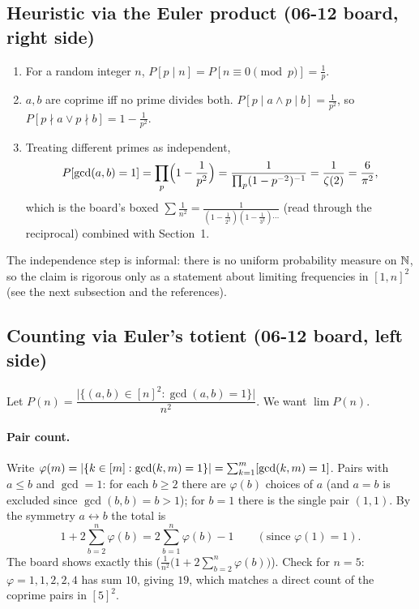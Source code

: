 \documentclass[11pt]{article}
\begin{document}
\subsection{Heuristic via the Euler product (06-12 board, right side)}
\begin{enumerate}[nosep]
  \item For a random integer $n$, $P[p\mid n]=P[n\equiv0\pmod p]=\frac1p$.
  \item $a,b$ are coprime iff no prime divides both. $P[p\mid a\wedge p\mid b]=\frac1{p^2}$, so $P[p\nmid a\vee p\nmid b]=1-\frac1{p^2}$.
  \item Treating different primes as independent,
  \[
  P[\gcd(a,b)=1]=\prod_p\Bigl(1-\frac1{p^2}\Bigr)=\frac1{\prod_p(1-p^{-2})^{-1}}=\frac1{\zeta(2)}=\frac6{\pi^2},
  \]
  which is the board's boxed $\sum\frac1{n^2}=\frac{1}{(1-\frac1{2^2})(1-\frac1{3^2})\cdots}$ (read through the reciprocal) combined with Section~1.
\end{enumerate}
The independence step is informal: there is no uniform probability measure on $\mathbb{N}$, so the claim is rigorous only as a statement about limiting frequencies in $[1,n]^2$ (see the next subsection and the references).

\subsection{Counting via Euler's totient (06-12 board, left side)}

Let $P(n)=\dfrac{\bigl|\{(a,b)\in[n]^2:\gcd(a,b)=1\}\bigr|}{n^2}$. We want $\lim P(n)$.

\paragraph{Pair count.} Write $\varphi(m)=|\{k\in[m]:\gcd(k,m)=1\}|=\sum_{k=1}^m[\gcd(k,m)=1]$. Pairs with $a\le b$ and $\gcd=1$: for each $b\ge2$ there are $\varphi(b)$ choices of $a$ (and $a=b$ is excluded since $\gcd(b,b)=b>1$); for $b=1$ there is the single pair $(1,1)$. By the symmetry $a\leftrightarrow b$ the total is
\[
1+2\sum_{b=2}^n\varphi(b)=2\sum_{b=1}^n\varphi(b)-1\qquad(\text{since }\varphi(1)=1).
\]
The board shows exactly this ($\frac1{n^2}\bigl(1+2\sum_{b=2}^n\varphi(b)\bigr)$). Check for $n=5$: $\varphi=1,1,2,2,4$ has sum $10$, giving $19$, which matches a direct count of the coprime pairs in $[5]^2$.
\end{document}
